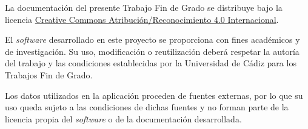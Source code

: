 {}
La documentación del presente Trabajo Fin de Grado se distribuye bajo la licencia \href{https://creativecommons.org/licenses/by/4.0/}{Creative Commons Atribución/Reconocimiento 4.0 Internacional}.

El \textit{software} desarrollado en este proyecto se proporciona con fines académicos y de investigación. Su uso, modificación o reutilización deberá respetar la autoría del trabajo y las condiciones establecidas por la Universidad de Cádiz para los Trabajos Fin de Grado.

Los datos utilizados en la aplicación proceden de fuentes externas, por lo que su uso queda sujeto a las condiciones de dichas fuentes y no forman parte de la licencia propia del \textit{software} o de la documentación desarrollada.